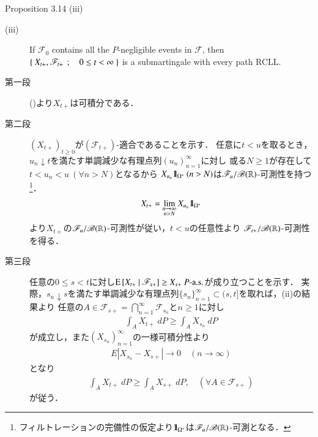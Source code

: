 	\begin{itembox}[l]{Proposition 3.14 (iii)}
		\begin{description}
			\item[(iii)] If $\mathscr{F}_0$ contains all the $P$-negligible events in $\mathscr{F}$, then
				$\left\{\ X_{t+},\mathscr{F}_{t+}\ \, ; \quad 0 \leq t < \infty\ \right\}$ is a submartingale with every path RCLL.
				\footnotemark
		\end{description}
	\end{itembox}
	\begin{prf}\mbox{}
		\begin{description}
			\item[第一段]
				()より$X_{t+}$は可積分である．
				
			\item[第二段]
				$(X_{t+})_{t \geq 0}$が$(\mathscr{F}_{t+})$-適合であることを示す．
				任意に$t < u$を取るとき，
				$u_n \downarrow t$を満たす単調減少な有理点列$(u_n)_{n=1}^\infty$に対し
				或る$N \geq 1$が存在して$t < u_n < u\ (\forall n > N)$となるから
				$X_{u_n}\mbox{1}\hspace{-0.25em}\mbox{l}_{\Omega^*}\ (n > N)$は$\mathscr{F}_u/\mathscr{B}(\mathbb{R})$-可測性を持つ
				\footnote{
					フィルトレーションの完備性の仮定より$\mbox{1}\hspace{-0.25em}\mbox{l}_{\Omega^*}$は$\mathscr{F}_u/\mathscr{B}(\mathbb{R})$-可測となる．
				}．
				\begin{align}
					X_{t+} = \lim_{\substack{n \to \infty \\ n > N}} X_{u_n} \mbox{1}\hspace{-0.25em}\mbox{l}_{\Omega^*}
				\end{align}
				より$X_{t+}$の$\mathscr{F}_u/\mathscr{B}(\mathbb{R})$-可測性が従い，$t < u$の任意性より
				$\mathscr{F}_{t+}/\mathscr{B}(\mathbb{R})$-可測性を得る．
			
			\item[第三段]
				任意の$0 \leq s < t$に対し$\cexp{X_{t+}}{\mathscr{F}_{s+}} \geq X_{s+}\ \mbox{$P$-a.s.}$が成り立つことを示す．
				実際，$s_n \downarrow s$を満たす単調減少な有理点列$\{s_n\}_{n=1}^\infty \subset (s,t]$を取れば，(ii)の結果より
				任意の$A \in \mathscr{F}_{s+} = \bigcap_{n=1}^\infty \mathscr{F}_{s_n}$と$n \geq 1$に対し
				\begin{align}
					\int_A X_{t+}\ dP \geq \int_A X_{s_n}\ dP
				\end{align}
				が成立し，また$(X_{s_n})_{n=1}^\infty$の一様可積分性より
				\begin{align}
					E\left| X_{s_n} - X_{s+} \right| \longrightarrow 0
					\quad (n \longrightarrow \infty)
				\end{align}
				となり
				\begin{align}
					\int_A X_{t+}\ dP \geq \int_A X_{s+}\ dP,
					\quad (\forall A \in \mathscr{F}_{s+})
				\end{align}
				が従う．
				

\end{description}
\end{prf}
